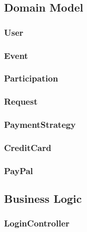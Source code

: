\documentclass[11pt]{article}
\begin{document}
        \subsection{Domain Model} \label{subsec:domain-model}

            \subsubsection{User} \label{subsubsec:user}

            \subsubsection{Event} \label{subsubsec:event}

            \subsubsection{Participation} \label{subsubsec:participation}

            \subsubsection{Request} \label{subsubsec:request}

            \subsubsection{PaymentStrategy} \label{subsubsec:pament-strategy}

            \subsubsection{CreditCard} \label{subsubsec:credit-card}

            \subsubsection{PayPal} \label{subsubsec:paypal}

        \subsection{Business Logic} \label{subsec:business-logic}

            \subsubsection{LoginController} \label{subsubsec:login-controller}
\end{document}
